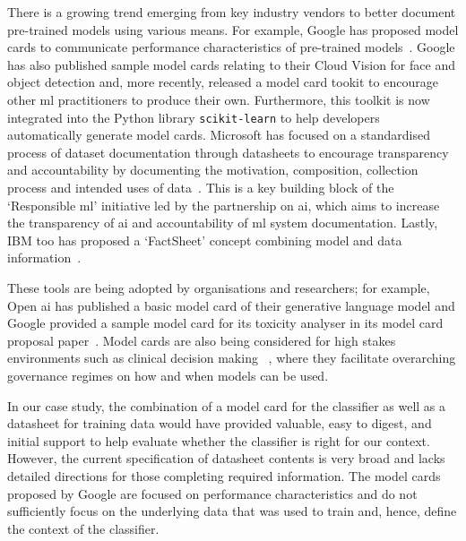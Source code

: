 There is a growing trend emerging from key industry vendors to better document pre-trained models using various means. For example, Google has proposed model cards to communicate performance characteristics of pre-trained models~\citep{Mitchell:2018in}.  Google has also published sample model cards relating to their Cloud Vision  for face and object detection and, more recently, released a model card tookit to encourage other \gls{ml} practitioners to produce their own. Furthermore, this toolkit is now integrated into the Python library \texttt{scikit-learn} to help developers automatically generate model cards. Microsoft has focused on a standardised process of dataset documentation through datasheets to encourage transparency and accountability by documenting the motivation, composition, collection process and intended uses of data~\citep{Gebru:2018wh}. This is a key building block of the `Responsible \gls{ml}' initiative led by the partnership on \gls{ai}, which aims to increase the transparency of \gls{ai} and accountability of \gls{ml} system documentation. Lastly, IBM too has proposed a `FactSheet' concept combining model and data information~\citep{Arnold2019FactSheets:Conformity}.  

These tools are being adopted by organisations and researchers;  for example, Open \gls{ai} has published a basic model card of their generative language model and Google provided a sample model card for its toxicity analyser in its model card proposal paper~\citep{Mitchell:2018in}.  Model cards are also being considered for high stakes environments such as clinical decision making~ \citep{Sendak2020PresentingLabels}, where they facilitate overarching governance regimes on how and when models can be used.

In our case study, the combination of a model card for the classifier as well as a datasheet for training data would have provided valuable, easy to digest, and initial support to help evaluate whether the classifier is right for our context.  However, the current specification of datasheet contents is very broad and lacks detailed directions for those completing required information.  The model cards proposed by Google are focused on performance characteristics and do not sufficiently focus on the underlying data that was used to train and, hence, define the context of the classifier.

